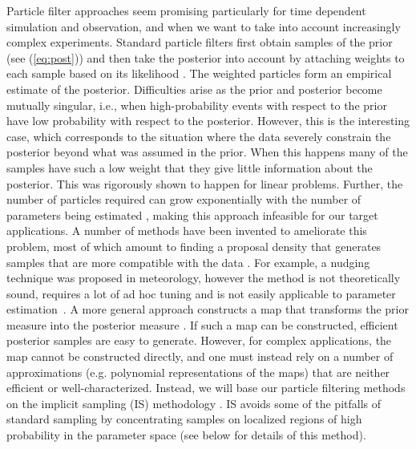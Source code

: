 \documentclass[11pt]{article}
\newcommand{\MarginPar}[1]{\marginpar{%
\vskip-\baselineskip %
\raggedright\tiny\sffamily
\hrule\smallskip{\color{red}#1}\par\smallskip\hrule}}
\begin{document}
Particle filter approaches seem promising particularly for time dependent simulation and observation,
and when we want to take into account increasingly complex experiments.
Standard particle filters first obtain samples of the prior (see (\ref{eq:post}))
and then take the posterior into account by attaching weights to each sample based on its 
likelihood \cite{Doucet2001,GordonSIR}.
The weighted particles form an empirical estimate of the posterior.
Difficulties arise as the prior and posterior become mutually
singular, i.e., when high-probability 
events with respect to the prior have low probability with respect to the posterior.
However, this is the interesting case, which corresponds to the situation where the data severely 
constrain the posterior beyond what was assumed in the prior.
When this happens many of the samples have such a low weight that they give little information about the posterior.
This was rigorously shown to happen for linear problems.
Further, the number of particles required can grow exponentially with the number
of parameters being estimated \cite{Bickel,BickelBootstrap,Bickel2,Snyder,Weare2012,Weare2009},
making this approach infeasible for 
our target applications.
A number of methods have been invented to ameliorate this problem, most of which amount to finding a proposal density that  generates samples that are more compatible with the data \cite{Doucet,OptimalImportanceFunction,liuchen1995,Brad}.
For example, a nudging technique was proposed in meteorology, however the method is not theoretically sound, requires a lot of ad hoc tuning  and is not easily applicable to parameter estimation~\cite{vanLeeuwen}.
A more general approach constructs a map that transforms the prior
measure into the posterior measure \cite{Moselhy2013}.  If such a map
can be constructed, efficient posterior samples are easy to generate.
However, for complex applications, the map cannot be constructed
directly, and one must instead rely on a number of approximations
(e.g. polynomial representations of the maps) that are neither efficient
or well-characterized.  Instead, we will base our particle filtering
methods on the implicit sampling (IS) methodology
\cite{chorintupnas,chorin2010,Morzfeld2011,Morzfeld2012,Atkins2013}.
IS avoids some of the pitfalls of standard sampling by
concentrating samples on localized regions of high probability in 
the parameter space (see below for details of this method).
\end{document}
